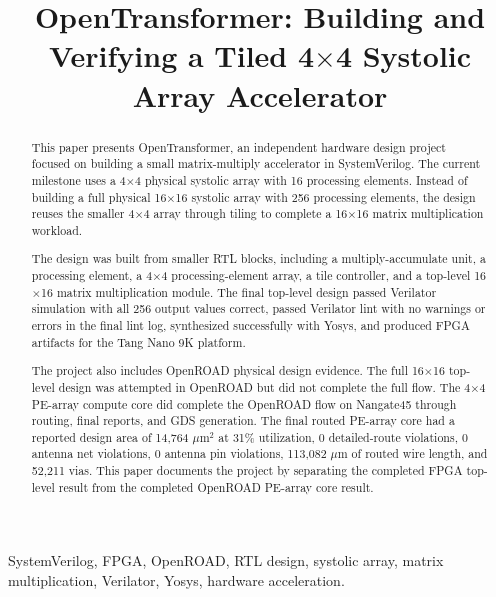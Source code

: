 \documentclass[conference]{IEEEtran}
\begin{document}
\title{OpenTransformer: Building and Verifying a Tiled 4$\times$4 Systolic Array Accelerator}

\author{
}

\maketitle

\begin{abstract}
This paper presents OpenTransformer, an independent hardware design project focused on building a small matrix-multiply accelerator in SystemVerilog. The current milestone uses a 4$\times$4 physical systolic array with 16 processing elements. Instead of building a full physical 16$\times$16 systolic array with 256 processing elements, the design reuses the smaller 4$\times$4 array through tiling to complete a 16$\times$16 matrix multiplication workload.

The design was built from smaller RTL blocks, including a multiply-accumulate unit, a processing element, a 4$\times$4 processing-element array, a tile controller, and a top-level 16$\times$16 matrix multiplication module. The final top-level design passed Verilator simulation with all 256 output values correct, passed Verilator lint with no warnings or errors in the final lint log, synthesized successfully with Yosys, and produced FPGA artifacts for the Tang Nano 9K platform.

The project also includes OpenROAD physical design evidence. The full 16$\times$16 top-level design was attempted in OpenROAD but did not complete the full flow. The 4$\times$4 PE-array compute core did complete the OpenROAD flow on Nangate45 through routing, final reports, and GDS generation. The final routed PE-array core had a reported design area of 14,764 $\mu$m$^2$ at 31\% utilization, 0 detailed-route violations, 0 antenna net violations, 0 antenna pin violations, 113,082 $\mu$m of routed wire length, and 52,211 vias. This paper documents the project by separating the completed FPGA top-level result from the completed OpenROAD PE-array core result.
\end{abstract}

\begin{IEEEkeywords}
SystemVerilog, FPGA, OpenROAD, RTL design, systolic array, matrix multiplication, Verilator, Yosys, hardware acceleration.
\end{IEEEkeywords}
\end{document}
